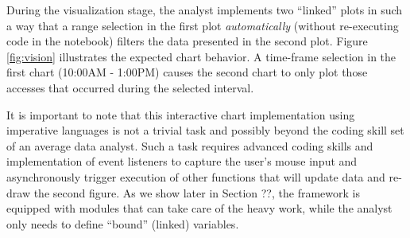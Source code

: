 {During the visualization stage, the analyst implements two ``linked'' plots in such a way that a range selection in the first plot \textit{automatically} (without re-executing code in the notebook) filters the data presented in the second plot. Figure \ref{fig:vision} illustrates the expected chart behavior. A time-frame selection in the first chart (10:00AM - 1:00PM) causes the second chart to only plot those accesses that occurred during the selected interval. 

It is important to note that this interactive chart implementation using imperative languages is not a trivial task and possibly beyond the coding skill set of an average data analyst. Such a task requires advanced coding skills and implementation of event listeners to capture the user's mouse input and asynchronously trigger execution of other functions that will update data and re-draw the second figure. As we show later in Section ??, the {\projname} framework is equipped with modules that can take care of the heavy work, while the analyst only needs to define ``bound'' (linked) variables.
}
